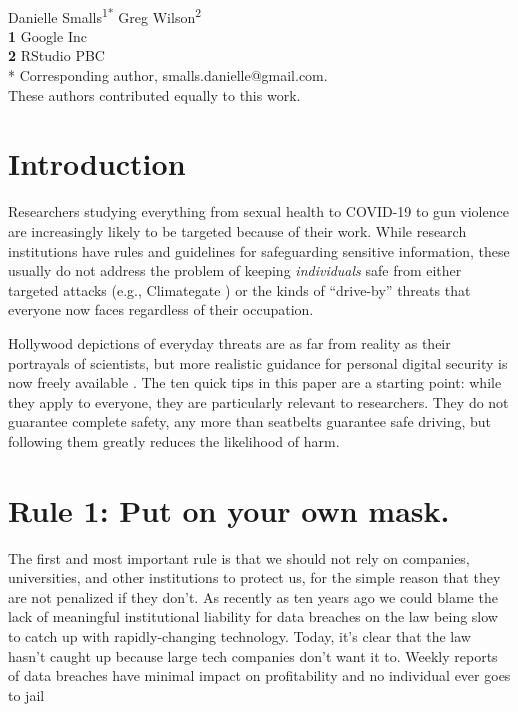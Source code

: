 \documentclass[10pt,letterpaper]{article}
\begin{document}
\vspace*{0.2in}

\begin{flushleft}
{\Large
\textbf{}
}
\newline
\\
{Danielle Smalls}\textsuperscript{1{\ddag}*}
{Greg Wilson}\textsuperscript{2{\ddag}}
\\
\bigskip
\textbf{1} Google Inc\\
\textbf{2} RStudio PBC\\
* Corresponding author, smalls.danielle@gmail.com. \\
\bigskip
{\ddag} These authors contributed equally to this work.
\end{flushleft}

\section*{Introduction}

Researchers studying everything from sexual health to COVID-19 to gun violence
are increasingly likely to be targeted because of their work.
While research institutions have rules and guidelines for safeguarding sensitive information,
these usually do not address the problem of keeping \emph{individuals} safe
from either targeted attacks (e.g., Climategate \cite{Natu2010})
or the kinds of ``drive-by'' threats that everyone now faces regardless of their occupation.

Hollywood depictions of everyday threats are as far from reality as their portrayals of scientists,
but more realistic guidance for personal digital security is now freely available \cite{FLD,EFJ2015,EFF}.
The ten quick tips in this paper are a starting point:
while they apply to everyone,
they are particularly relevant to researchers.
They do not guarantee complete safety,
any more than seatbelts guarantee safe driving,
but following them greatly reduces the likelihood of harm.

\section*{Rule 1: Put on your own mask.}

The first and most important rule is that
we should not rely on companies, universities, and other institutions to protect us,
for the simple reason that they are not penalized if they don't.
As recently as ten years ago we could blame the lack of meaningful institutional liability for data breaches
on the law being slow to catch up with rapidly-changing technology.
Today,
it's clear that the law hasn't caught up because large tech companies don't want it to.
Weekly reports of data breaches have minimal impact on profitability and no individual ever goes to jail
\end{document}
